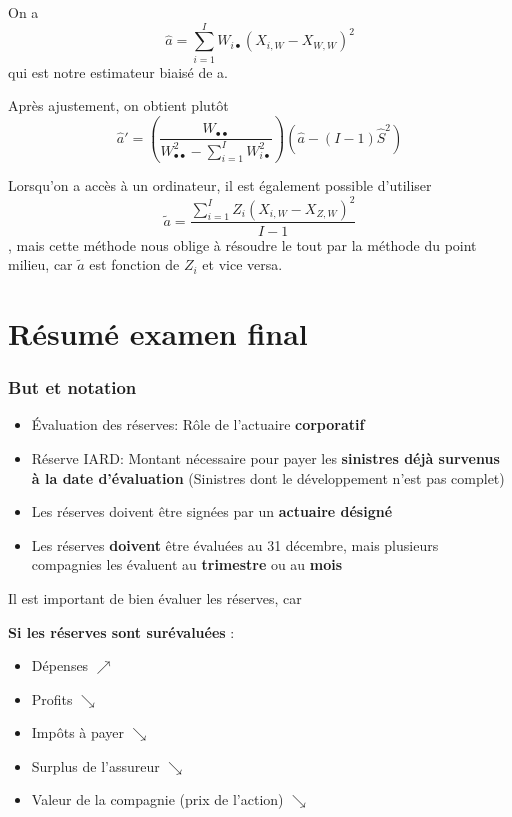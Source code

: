 \documentclass[11pt,french]{report}
\begin{document}
On a
$$\boxed{\widehat{a} = \sum_{i=1}^I W_{i \bullet} (X_{i,W}-X_{W,W})^2}$$
qui est notre estimateur biaisé de a. 

Après ajustement, on obtient plutôt
$$\boxed{\widehat{a}' = \left(\frac{W_{\bullet \bullet}}{W_{\bullet \bullet}^2 - \sum_{i=1}^I W_{i \bullet}^2} \right) \left(\widehat{a} - (I-1)\widehat{S}^2 \right)}$$

Lorsqu'on a accès à un ordinateur, il est également possible d'utiliser
$$\boxed{\tilde{a} = \frac{\sum_{i=1}^I Z_i(X_{i,W} - X_{Z,W})^2}{I-1}}$$
, mais cette méthode nous oblige à résoudre le tout par la méthode du point milieu, car $\tilde{a}$ est fonction de $Z_i$ et vice versa.

\chapter{Résumé examen final}

\subsection*{But et notation} 

\begin{itemize}
\item Évaluation des réserves: Rôle de l'actuaire \textbf{corporatif}
\item Réserve IARD: Montant nécessaire pour payer les \textbf{sinistres déjà survenus à la date d'évaluation} (Sinistres dont le développement n'est pas complet)
\item Les réserves doivent être signées par un \textbf{actuaire désigné}
\item Les réserves \textbf{doivent} être évaluées au 31 décembre, mais plusieurs compagnies les évaluent au \textbf{trimestre} ou au \textbf{mois}
\end{itemize}

Il est important de bien évaluer les réserves, car

\textbf{Si les réserves sont surévaluées }:
\begin{itemize}
  \item Dépenses $\nearrow$
  \item Profits $\searrow$
  \item Impôts à payer $\searrow$
  \item Surplus de l'assureur $\searrow$
  \item Valeur de la compagnie (prix de l'action) $\searrow$
\end{itemize}
\end{document}
